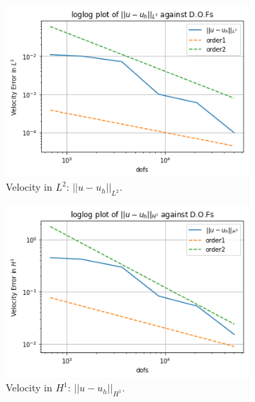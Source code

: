 \documentclass[12pt,a4paper]{article}
\theoremstyle{definition}
\begin{document}
\begin{figure}[H]
	\begin{subfigure}[b]{.45\linewidth}
		\includegraphics[width=\linewidth]{u_uh_L2}
		\caption{Velocity in $L^2$: $\left|\left|u-u_h\right|\right|_{L^2}$.}
		\label{fig_uL2}
	\end{subfigure}
	\begin{subfigure}[b]{.45\linewidth}
		\includegraphics[width=\linewidth]{u_uh_H1}
		\caption{Velocity in $H^1$: $\left|\left|u-u_h\right|\right|_{H^1}$.}
		\label{fig_uH1}
	\end{subfigure}
	\centering
	\begin{subfigure}[b]{.45\linewidth}

\end{subfigure}
\end{figure}
\end{document}
